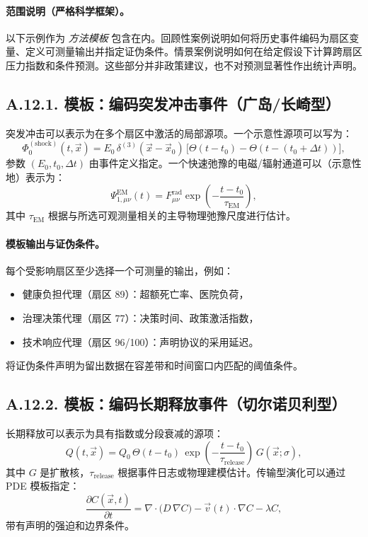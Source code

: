 \documentclass[11pt,a4paper]{article}
\begin{document}
	\paragraph{范围说明（严格科学框架）。}
	以下示例作为 \emph{方法模板} 包含在内。回顾性案例说明如何将历史事件编码为扇区变量、定义可测量输出并指定证伪条件。情景案例说明如何在给定假设下计算跨扇区压力指数和条件预测。这些部分并非政策建议，也不对预测显著性作出统计声明。
	
	\subsection*{A.12.1. 模板：编码突发冲击事件（广岛/长崎型）}
	
	突发冲击可以表示为在多个扇区中激活的局部源项。一个示意性源项可以写为：
	$$
	\Phi_{0}^{(\mathrm{shock})}(t,\vec{x}) = E_0\,\delta^{(3)}(\vec{x}-\vec{x}_0)\,\big[\Theta(t-t_0)-\Theta(t-(t_0+\Delta t))\big],
	$$
	参数 $(E_0,t_0,\Delta t)$ 由事件定义指定。一个快速弛豫的电磁/辐射通道可以（示意性地）表示为：
	$$
	\Psi_{1,\mu\nu}^{\mathrm{EM}}(t)=F_{\mu\nu}^{\mathrm{rad}}\exp\!\left(-\frac{t-t_0}{\tau_{\mathrm{EM}}}\right),
	$$
	其中 $\tau_{\mathrm{EM}}$ 根据与所选可观测量相关的主导物理弛豫尺度进行估计。
	
	\paragraph{模板输出与证伪条件。}
	每个受影响扇区至少选择一个可测量的输出，例如：
	\begin{itemize}[leftmargin=*]
		\item 健康负担代理（扇区 89）：超额死亡率、医院负荷，
		\item 治理决策代理（扇区 77）：决策时间、政策激活指数，
		\item 技术响应代理（扇区 96/100）：声明协议的采用延迟。
	\end{itemize}
	将证伪条件声明为留出数据在容差带和时间窗口内匹配的阈值条件。
	
	\subsection*{A.12.2. 模板：编码长期释放事件（切尔诺贝利型）}
	
	长期释放可以表示为具有指数或分段衰减的源项：
	$$
	Q(t,\vec{x}) = Q_0\,\Theta(t-t_0)\,\exp\!\left(-\frac{t-t_0}{\tau_{\mathrm{release}}}\right)\,G(\vec{x};\sigma),
	$$
	其中 $G$ 是扩散核，$\tau_{\mathrm{release}}$ 根据事件日志或物理建模估计。传输型演化可以通过 PDE 模板指定：
	$$
	\frac{\partial C(\vec{x},t)}{\partial t}
	= \nabla\cdot\big(D\,\nabla C\big) - \vec{v}(t)\cdot\nabla C - \lambda C,
	$$
	带有声明的强迫和边界条件。
	
\end{document}
